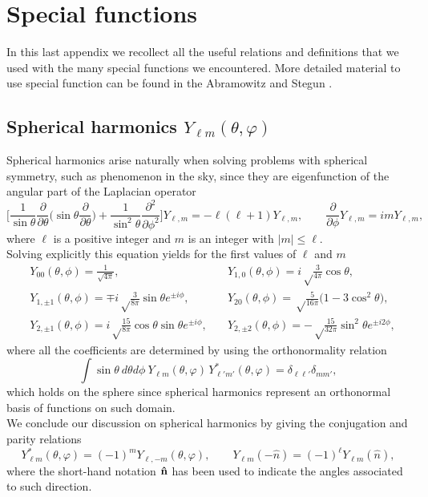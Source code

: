 \chapter{Special functions}
\label{app:special-functions}
In this last appendix we recollect all the useful relations and definitions that we used with the many special functions we encountered. More detailed material to use special function can be found in the Abramowitz and Stegun \cite{abramowitz+stegun}.

\section{Spherical harmonics \(Y_{\ell m}(\theta,\varphi)\)}
\label{app:spherical-harmonics}
Spherical harmonics arise naturally when solving problems with spherical symmetry, such as phenomenon in the sky, since they are eigenfunction of the angular part of the Laplacian operator 
$$
\Bigg[\frac{1}{\sin\theta}\frac{\partial}{\partial \theta}\bigg(\sin\theta\frac{\partial}{\partial\theta}\bigg)+\frac{1}{\sin^2\theta}\frac{\partial^2}{\partial\phi^2}\Bigg]Y_{\ell,m}=-\ell(\ell+1)Y_{\ell,m},\qquad \frac{\partial}{\partial\phi}Y_{\ell,m}=im Y_{\ell,m},$$
where $\ell$ is a positive integer and $m$ is an integer with $|m|\leq \ell$.\\
Solving explicitly this equation yields for the first values of $\ell$ and $m$
\begin{align*}
&Y_{00}(\theta,\phi)=\frac{1}{\sqrt{4\pi}}, &Y_{1,0}(\theta,\phi)=i\sqrt\frac{3}{4\pi}\cos{\theta},\\ &Y_{1,\pm1}(\theta,\phi)=\mp i\sqrt\frac{3}{8\pi}\sin\theta e^{\pm i\phi},\quad
&Y_{20}(\theta,\phi)=\sqrt\frac{5}{16\pi}\big(1-3\cos^2\theta\big), \\ &Y_{2,\pm1}(\theta,\phi)=i\sqrt\frac{15}{8\pi}\cos{\theta}\sin\theta e^{\pm i\phi},\quad &Y_{2,\pm2}(\theta,\phi)=-\sqrt\frac{15}{32\pi}\sin^2\theta e^{\pm i2\phi},
\end{align*}
where all the coefficients are determined by using the orthonormality relation
\[
\int\sin\theta\ d\theta d\phi\ Y_{\ell m}(\theta,\varphi)\,Y^*_{\ell' m'}(\theta,\varphi)
=\delta_{\ell\ell'}\delta_{mm'},
\]
which holds on the sphere since spherical harmonics represent an orthonormal basis of functions on such domain.\\
We conclude our discussion on spherical harmonics by giving the conjugation and parity relations  
\[
Y_{\ell m}^*(\theta,\varphi)=(-1)^m Y_{\ell,-m}(\theta,\varphi),\qquad
Y_{\ell m}(-\hat n)=(-1)^\ell Y_{\ell m}(\hat n),
\]
where the short-hand notation $\mathbf{\hat{n}}$ has been used to indicate the angles associated to such direction.


